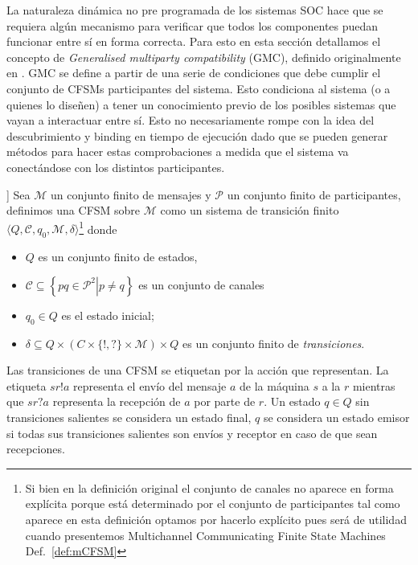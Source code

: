 La naturaleza dinámica no pre programada de los sistemas SOC hace que se requiera algún mecanismo para verificar que todos los componentes puedan funcionar entre sí en forma correcta. Para esto en esta sección detallamos el concepto de \emph{Generalised multiparty compatibility} (GMC), definido originalmente en \cite{lange:popl15}. GMC se define a partir de una serie de condiciones que debe cumplir el conjunto de CFSMs participantes del sistema. Esto condiciona al sistema (o a quienes lo diseñen) a tener un conocimiento previo de los posibles sistemas que vayan a interactuar entre sí. Esto no necesariamente rompe con la idea del descubrimiento y binding en tiempo de ejecución dado que se pueden generar métodos para hacer estas comprobaciones a medida que el sistema va conectándose con los distintos participantes. %

\begin{definition}\label{def:CFSM}] Sea $\mathcal{M}$ un conjunto finito de mensajes y $\mathcal{P}$ un conjunto finito de participantes, definimos una CFSM sobre $\mathcal{M}$ como un sistema de transición finito $\langle Q, \mathcal{C}, q_0, \mathcal{M}, \delta \rangle$\footnote{Si bien en la definición original el conjunto de canales no aparece en forma explícita porque está determinado por el conjunto de participantes tal como aparece en esta definición optamos por hacerlo explícito pues será de utilidad cuando presentemos Multichannel Communicating Finite State Machines Def.~\ref{def:mCFSM}} donde
\begin{itemize}
  \item $Q$ es un conjunto finito de estados, 
  \item $\mathcal{C} \subseteq \left\{ pq \in \mathcal{P}^2 \left|\right. p \not= q\right\}$ es un conjunto de canales
  \item $q_0 \in Q$ es el estado inicial;
  \item $\delta \subseteq Q \times (C \times \{!,?\} \times \mathcal{M}) \times Q$ es un conjunto finito de \emph{transiciones}.
  \end{itemize}

Las transiciones de una CFSM se etiquetan por la acción que representan. La etiqueta $sr!a$ representa el envío del mensaje $a$ de la máquina $s$ a la $r$ mientras que $sr?a$ representa la recepción de $a$ por parte de $r$. Un estado
$q \in Q$ sin transiciones salientes se considera un estado final, $q$ se considera un estado emisor si todas sus transiciones salientes son envíos y receptor en caso de que sean recepciones. 
\end{definition} 

